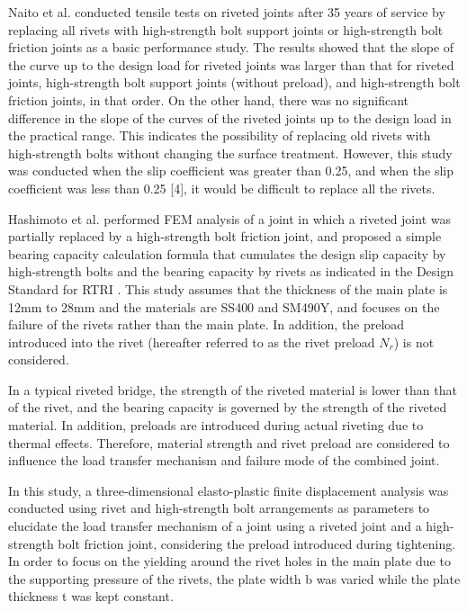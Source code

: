 Naito et al. \cite{naito2007basic} conducted tensile tests on riveted joints after 35 years of service by replacing all rivets with high-strength bolt support joints or high-strength bolt friction joints as a basic performance study. The results showed that the slope of the curve up to the design load for riveted joints was larger than that for riveted joints, high-strength bolt support joints (without preload), and high-strength bolt friction joints, in that order. On the other hand, there was no significant difference in the slope of the curves of the riveted joints up to the design load in the practical range. This indicates the possibility of replacing old rivets with high-strength bolts without changing the surface treatment. However, this study was conducted when the slip coefficient was greater than 0.25, and when the slip coefficient was less than 0.25 [4], it would be difficult to replace all the rivets.

Hashimoto et al. \cite{hashimoto2008} performed FEM analysis of a joint in which a riveted joint was partially replaced by a high-strength bolt friction joint, and proposed a simple bearing capacity calculation formula that cumulates the design slip capacity by high-strength bolts and the bearing capacity by rivets as indicated in the Design Standard for \ac{RTRI} \cite{rtri2009Design}. This study assumes that the thickness of the main plate is 12mm to 28mm and the materials are SS400 and SM490Y, and focuses on the failure of the rivets rather than the main plate. In addition, the preload introduced into the rivet (hereafter referred to as the rivet preload $N_r$) is not considered.

In a typical riveted bridge, the strength of the riveted material is lower than that of the rivet, and the bearing capacity is governed by the strength of the riveted material. In addition, preloads are introduced during actual riveting due to thermal effects. Therefore, material strength and rivet preload are considered to influence the load transfer mechanism and failure mode of the combined joint.

In this study, a three-dimensional elasto-plastic finite displacement analysis was conducted using rivet and high-strength bolt arrangements as parameters to elucidate the load transfer mechanism of a joint using a riveted joint and a high-strength bolt friction joint, considering the preload introduced during tightening. In order to focus on the yielding around the rivet holes in the main plate due to the supporting pressure of the rivets, the plate width b was varied while the plate thickness t was kept constant.

